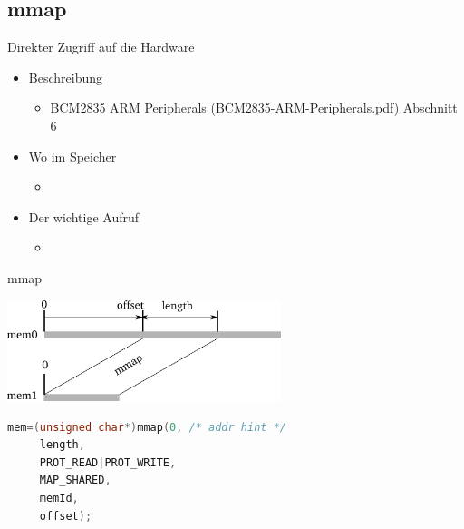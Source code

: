 \documentclass{beamer}
\begin{document}
\subsection{mmap}
\begin{frame}{}{Direkter Zugriff auf die Hardware}
 \begin{itemize}
  \item Beschreibung
   \begin{itemize}
    \item BCM2835 ARM Peripherals (BCM2835-ARM-Peripherals.pdf) Abschnitt 6
   \end{itemize}
  \item Wo im Speicher
   \begin{itemize}
    \item {}
   \end{itemize}
 \item Der wichtige Aufruf
  \begin{itemize}
   \item {}
  \end{itemize}
 \end{itemize}
\end{frame}

\begin{frame}[fragile]{mmap}
\begin{center}
 \includegraphics[width=8cm]{mmap.pdf}
\end{center}
\begin{lstlisting}[language=C]
 mem=(unsigned char*)mmap(0, /* addr hint */
     length,
     PROT_READ|PROT_WRITE,
     MAP_SHARED, 
     memId,
     offset);
\end{lstlisting}
\end{frame}
\end{document}
